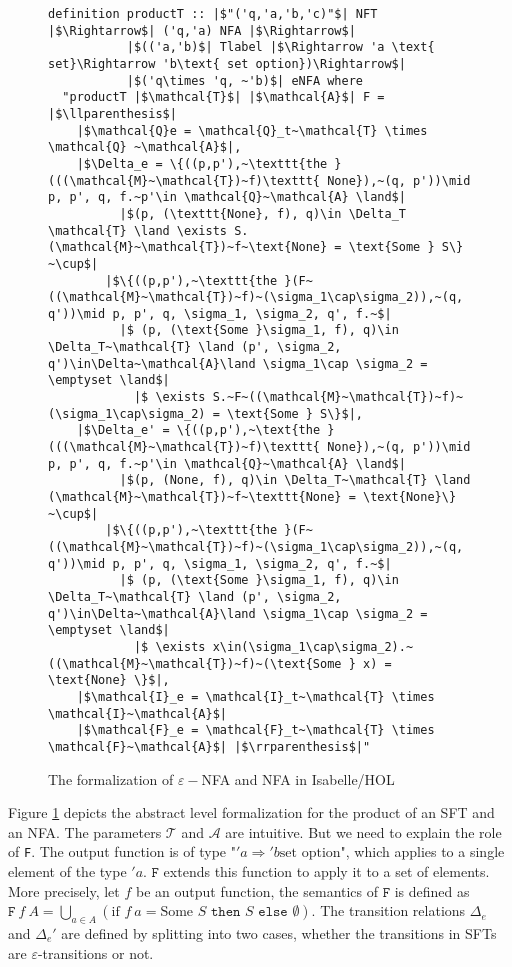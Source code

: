 \documentclass[a4paper,UKenglish,cleveref, autoref, thm-restate]{lipics-v2021}
\begin{document}
\begin{figure}[hbt!]
	\begin{lstlisting}
definition productT :: |$"('q,'a,'b,'c)"$| NFT |$\Rightarrow$| ('q,'a) NFA |$\Rightarrow$| 
           |$(('a,'b)$| Tlabel |$\Rightarrow 'a \text{ set}\Rightarrow 'b\text{ set option})\Rightarrow$|
           |$('q\times 'q, ~'b)$| eNFA where
  "productT |$\mathcal{T}$| |$\mathcal{A}$| F = |$\llparenthesis$|
    |$\mathcal{Q}e = \mathcal{Q}_t~\mathcal{T} \times \mathcal{Q} ~\mathcal{A}$|,
    |$\Delta_e = \{((p,p'),~\texttt{the }(((\mathcal{M}~\mathcal{T})~f)\texttt{ None}),~(q, p'))\mid p, p', q, f.~p'\in \mathcal{Q}~\mathcal{A} \land$|
          |$(p, (\texttt{None}, f), q)\in \Delta_T \mathcal{T} \land \exists S. (\mathcal{M}~\mathcal{T})~f~\text{None} = \text{Some } S\} ~\cup$|
        |$\{((p,p'),~\texttt{the }(F~((\mathcal{M}~\mathcal{T})~f)~(\sigma_1\cap\sigma_2)),~(q, q'))\mid p, p', q, \sigma_1, \sigma_2, q', f.~$|
          |$ (p, (\text{Some }\sigma_1, f), q)\in \Delta_T~\mathcal{T} \land (p', \sigma_2, q')\in\Delta~\mathcal{A}\land \sigma_1\cap \sigma_2 = \emptyset \land$|
            |$ \exists S.~F~((\mathcal{M}~\mathcal{T})~f)~(\sigma_1\cap\sigma_2) = \text{Some } S\}$|,
    |$\Delta_e' = \{((p,p'),~\text{the }(((\mathcal{M}~\mathcal{T})~f)\texttt{ None}),~(q, p'))\mid p, p', q, f.~p'\in \mathcal{Q}~\mathcal{A} \land$|
          |$(p, (None, f), q)\in \Delta_T~\mathcal{T} \land (\mathcal{M}~\mathcal{T})~f~\texttt{None} = \text{None}\} ~\cup$|
        |$\{((p,p'),~\texttt{the }(F~((\mathcal{M}~\mathcal{T})~f)~(\sigma_1\cap\sigma_2)),~(q, q'))\mid p, p', q, \sigma_1, \sigma_2, q', f.~$|
          |$ (p, (\text{Some }\sigma_1, f), q)\in \Delta_T~\mathcal{T} \land (p', \sigma_2, q')\in\Delta~\mathcal{A}\land \sigma_1\cap \sigma_2 = \emptyset \land$|
            |$ \exists x\in(\sigma_1\cap\sigma_2).~((\mathcal{M}~\mathcal{T})~f)~(\text{Some } x) = \text{None} \}$|,
    |$\mathcal{I}_e = \mathcal{I}_t~\mathcal{T} \times \mathcal{I}~\mathcal{A}$|
    |$\mathcal{F}_e = \mathcal{F}_t~\mathcal{T} \times \mathcal{F}~\mathcal{A}$| |$\rrparenthesis$|"
	\end{lstlisting}
\caption{The formalization of $\varepsilon-$NFA and NFA in Isabelle/HOL}
\label{fig-def-FTProd}
\end{figure}

Figure \ref{fig-def-FTProd} depicts the abstract level formalization for the product of an SFT and an NFA. The parameters $\mathcal{T}$ and $\mathcal{A}$ are intuitive. But we need to explain the role of \texttt{F}. The output function is of type "$'a \Rightarrow 'b \text{set option}$", which applies to a single element of the type $'a$. $\texttt{F}$ extends this function to apply it to a set of elements. More precisely, let $f$ be an output function, the semantics of $\texttt{F}$ is defined as $\texttt{F}~f~A=\bigcup_{a\in A} (\text{if }f~a= \text{Some }S \texttt{ then } S \texttt{ else } \emptyset)$.
The transition relations $\Delta_e$ and $\Delta_e'$ are defined by splitting into two cases, whether the transitions in SFTs are $\varepsilon$-transitions or not.
\end{document}
